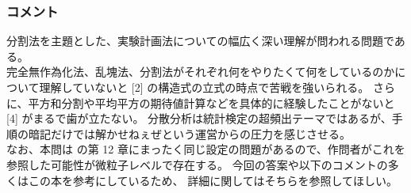 \documentclass[./main.tex]{subfiles}
\begin{document}
    \subsubsection*{コメント}
    分割法を主題とした、実験計画法についての幅広く深い理解が問われる問題である。\\
    完全無作為化法、乱塊法、分割法がそれぞれ何をやりたくて何をしているのかについて理解していないと [2] の構造式の立式の時点で苦戦を強いられる。
    さらに、平方和分割や平均平方の期待値計算などを具体的に経験したことがないと [4] がまるで歯が立たない。
    分散分析は統計検定の超頻出テーマではあるが、手順の暗記だけでは解かせねぇぜという運営からの圧力を感じさせる。\\

    なお、本問は \cite{nagata:2000} の第 12 章にまったく同じ設定の問題があるので、作問者がこれを参照した可能性が微粒子レベルで存在する。
    今回の答案や以下のコメントの多くはこの本を参考にしているため、
    詳細に関してはそちらを参照してほしい。
\end{document}
